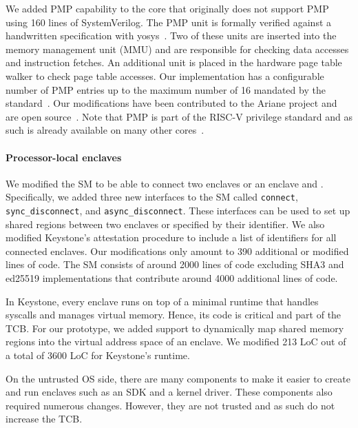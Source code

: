 We added PMP capability to the core that originally does not support PMP using 160 lines of SystemVerilog. The PMP unit is formally verified against a handwritten specification with yosys~\cite{wolf2016yosys}. Two of these units are inserted into the memory management unit (MMU) and are responsible for checking data accesses and instruction fetches. An additional unit is placed in the hardware page table walker to check page table accesses.
Our implementation has a configurable number of PMP entries up to the maximum number of 16 mandated by the standard~\cite{riscv2019privspec}. Our modifications have been contributed to the Ariane project and are open source~\cite{arianegithub}. Note that PMP is part of the RISC-V privilege standard and as such is already available on many other cores~\cite{asanovic2016rocket,ibex}. 

\paragraph{Processor-local enclaves}
We modified the SM to be able to connect two enclaves or an enclave and \sphw. Specifically, we added three new interfaces to the SM called \texttt{connect}, \texttt{sync\_disconnect}, and \texttt{async\_disconnect}. These interfaces can be used to set up shared regions between two enclaves or \sphw specified by their identifier. We also modified Keystone's attestation procedure to include a list of identifiers for all connected enclaves. Our modifications only amount to 390 additional or modified lines of code. The SM consists of around 2000 lines of code excluding SHA3 and ed25519 implementations that contribute around 4000 additional lines of code. %

In Keystone, every enclave runs on top of a minimal runtime that handles syscalls and manages virtual memory. Hence, its code is critical and part of the TCB. For our prototype, we added support to dynamically map shared memory regions into the virtual address space of an enclave. We modified 213 LoC out of a total of 3600 LoC for Keystone's runtime.

On the untrusted OS side, there are many components to make it easier to create and run enclaves such as an SDK and a kernel driver. These components also required numerous changes. However, they are not trusted and as such do not increase the TCB. 

